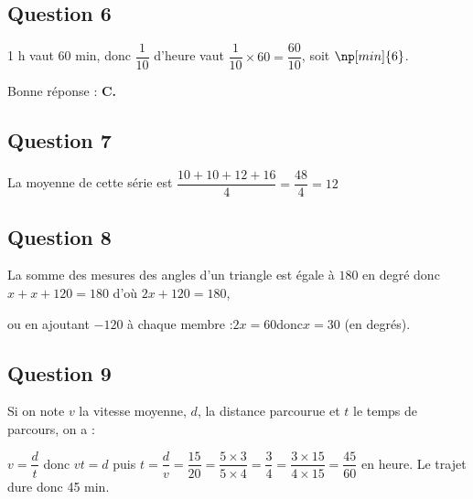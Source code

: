 \subsection*{Question 6}

1 h vaut 60 min, donc $\dfrac{1}{10}$ d'heure vaut $\dfrac{1}{10}\times 60 = \dfrac{60}{10}$, soit  $\np[min]{6}$.

Bonne réponse : \textbf{C.}


\subsection*{Question 7}

La moyenne de cette série est $\dfrac{10+10+12+16}{4} = \dfrac{48}{4} = {12}$

\subsection*{Question 8}

La somme des mesures des angles d'un triangle est égale à $180$ en degré donc \quad
$x+x+120 = 180$ \quad d'où \quad $2x+120 = 180$,

ou en ajoutant $- 120$ à chaque membre :\quad $2x = 60$\quad donc\quad $x = 30$ (en degrés).

\subsection*{Question 9}

Si on note $v$ la vitesse moyenne, $d$, la distance parcourue et $t$ le temps de parcours, on a :

$v = \dfrac{d}{t}$ \quad donc \quad $vt = d$ puis $t = \dfrac{d}{v} = \dfrac{15}{20} = \dfrac{5\times 3}{5\times 4} = {\dfrac{3}{4}} = \dfrac{3 \times 15}{4 \times 15} = \dfrac{45}{60}$ en heure.
\quad
Le trajet dure  donc 45 min.

